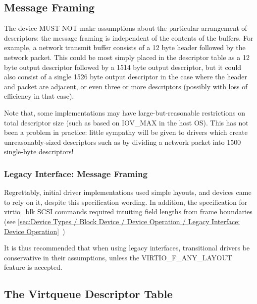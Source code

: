 \subsection{Message Framing}\label{sec:Basic Facilities of a Virtio Device / Virtqueues / Message Framing}
The device MUST NOT make assumptions about the particular arrangement
of descriptors: the message framing is
independent of the contents of the buffers. For example, a network
transmit buffer consists of a 12 byte header followed by the network
packet. This could be most simply placed in the descriptor table as a
12 byte output descriptor followed by a 1514 byte output descriptor,
but it could also consist of a single 1526 byte output descriptor in
the case where the header and packet are adjacent, or even three or
more descriptors (possibly with loss of efficiency in that case).

Note that, some implementations may have large-but-reasonable
restrictions on total descriptor size (such as based on IOV_MAX in the
host OS). This has not been a problem in practice: little sympathy
will be given to drivers which create unreasonably-sized descriptors
such as by dividing a network packet into 1500 single-byte
descriptors!

\subsubsection{Legacy Interface: Message Framing}\label{sec:Basic Facilities of a Virtio Device / Virtqueues / Message Framing / Legacy Interface: Message Framing}

Regrettably, initial driver implementations used simple layouts, and
devices came to rely on it, despite this specification wording.  In
addition, the specification for virtio_blk SCSI commands required
intuiting field lengths from frame boundaries (see
 \ref{sec:Device Types / Block Device / Device Operation / Legacy Interface: Device Operation}~)

It is thus recommended that when using legacy interfaces, transitional
drivers be conservative in their assumptions, unless the
VIRTIO_F_ANY_LAYOUT feature is accepted.

\subsection{The Virtqueue Descriptor Table}\label{sec:Basic Facilities of a Virtio Device / Virtqueues / The Virtqueue Descriptor Table}

